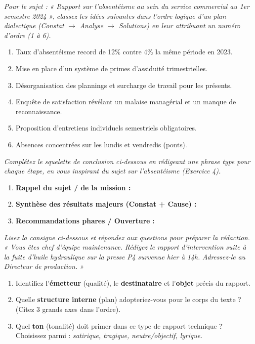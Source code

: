 \documentclass[11pt]{article}
\begin{document}
\begin{exercice}
\emph{Pour le sujet : « Rapport sur l'absentéisme au sein du service commercial au 1er semestre 2024 », classez les idées suivantes dans l'ordre logique d'un plan dialectique (Constat $\rightarrow$ Analyse $\rightarrow$ Solutions) en leur attribuant un numéro d'ordre (1 à 6).}
\begin{enumerate}
    \item Taux d'absentéisme record de 12\% contre 4\% la même période en 2023.
    \item Mise en place d'un système de primes d'assiduité trimestrielles.
    \item Désorganisation des plannings et surcharge de travail pour les présents.
    \item Enquête de satisfaction révélant un malaise managérial et un manque de reconnaissance.
    \item Proposition d'entretiens individuels semestriels obligatoires.
    \item Absences concentrées sur les lundis et vendredis (ponts).
\end{enumerate}
\end{exercice}

\begin{exercice}
\emph{Complétez le squelette de conclusion ci-dessous en rédigeant une phrase type pour chaque étape, en vous inspirant du sujet sur l'absentéisme (Exercice 4).}
\begin{enumerate}
    \item \textbf{Rappel du sujet / de la mission :} \underline{\hspace{14cm}}
    \item \textbf{Synthèse des résultats majeurs (Constat + Cause) :} \underline{\hspace{14cm}}
    \item \textbf{Recommandations phares / Ouverture :} \underline{\hspace{14cm}}
\end{enumerate}
\end{exercice}

\begin{exercice}
\emph{Lisez la consigne ci-dessous et répondez aux questions pour préparer la rédaction.}
\noindent \textit{« Vous êtes chef d'équipe maintenance. Rédigez le rapport d'intervention suite à la fuite d'huile hydraulique sur la presse P4 survenue hier à 14h. Adressez-le au Directeur de production. »}
\begin{enumerate}
    \item Identifiez l'\textbf{émetteur} (qualité), le \textbf{destinataire} et l'\textbf{objet} précis du rapport.
    \item Quelle \textbf{structure interne} (plan) adopteriez-vous pour le corps du texte ? (Citez 3 grands axes dans l'ordre).
    \item Quel \textbf{ton} (tonalité) doit primer dans ce type de rapport technique ? Choisissez parmi : \textit{satirique, tragique, neutre/objectif, lyrique}.
\end{enumerate}
\end{exercice}
\end{document}
